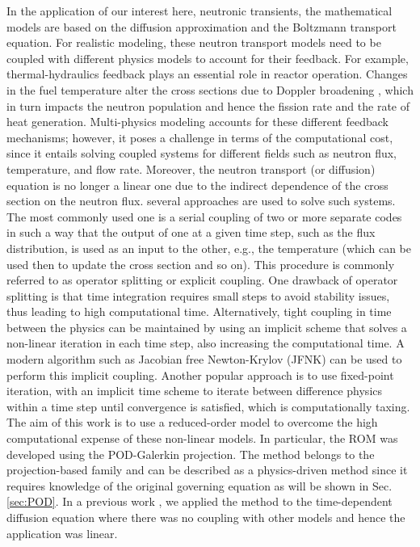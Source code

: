 \documentclass[review,number,sort&compress,12pt]{elsarticle}
\begin{document}
In the application of our interest here, neutronic transients, the mathematical models are based on the diffusion approximation and the Boltzmann transport equation.
For realistic modeling, these neutron transport models need to be coupled with different physics models to account for their feedback.
For example, thermal-hydraulics feedback plays an essential role in reactor operation.
Changes in the fuel temperature alter the cross sections due to Doppler broadening \cite{stacey2018nuclear}, which in turn impacts the neutron population and hence the fission rate and the rate of heat generation.
Multi-physics modeling accounts for these different feedback mechanisms; however, it poses a challenge in terms of the computational cost,
since it entails solving coupled systems for different fields such as neutron flux, temperature, and flow rate.
Moreover, the neutron transport (or diffusion) equation is no longer a linear one due to the indirect dependence of the cross section on the neutron flux.
several approaches are used to solve such systems.
The most commonly used one is a serial coupling of two or more separate codes in such a way that the output of one at a given time step, such as the flux distribution, is used as an input to the other, e.g., the temperature (which can be used then to update the cross section and so on).
This procedure is commonly referred to as operator splitting or explicit coupling.
One drawback of operator splitting is that time integration requires small steps to avoid stability issues, thus leading to high computational time. 
Alternatively, tight coupling in time between the physics can be maintained by using an implicit scheme that solves a non-linear iteration in each time step, also increasing the computational time.
A modern algorithm such as Jacobian free Newton-Krylov (JFNK) \cite{gaston2009parallel} can be used to perform this implicit coupling.
Another popular approach is to use fixed-point iteration, with an implicit time scheme to iterate between difference physics within a time step until convergence is satisfied, which is computationally taxing.
The aim of this work is to use a reduced-order model to overcome the high computational expense of these non-linear models.
In particular, the ROM was developed using the POD-Galerkin projection.
The method belongs to the projection-based family and can be described as a physics-driven method since it requires knowledge of the original governing equation as will be shown in Sec.\ref{sec:POD}.
In a previous work \cite{elzohery2021exploring}, we applied the method to the time-dependent diffusion equation where there was no coupling with other models and hence the application was linear.
\end{document}
